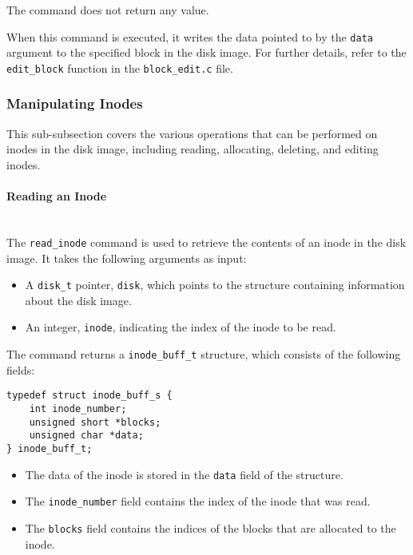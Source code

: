 \documentclass{article}
\begin{document}
The command does not return any value.

When this command is executed, it writes the data pointed to by the \texttt{data} argument to the specified block in the disk image. For further details, refer to the \texttt{edit\_block} function in the \texttt{block\_edit.c} file.

\subsubsection{Manipulating Inodes}

This sub-subsection covers the various operations that can be performed on inodes in the disk image, including reading, allocating, deleting, and editing inodes.

\paragraph{Reading an Inode}\mbox{}\\
The \texttt{read\_inode} command is used to retrieve the contents of an inode in the disk image. It takes the following arguments as input:

\begin{itemize}
    \item A \texttt{disk\_t} pointer, \texttt{disk}, which points to the structure containing information about the disk image.
    \item An integer, \texttt{inode}, indicating the index of the inode to be read.
\end{itemize}

The command returns a \texttt{inode\_buff\_t} structure, which consists of the following fields:

\begin{lstlisting}[style=cstyle]
typedef struct inode_buff_s {
    int inode_number;
    unsigned short *blocks;
    unsigned char *data;
} inode_buff_t;
\end{lstlisting}

\begin{itemize}
    \item The data of the inode is stored in the \texttt{data} field of the structure.
    \item The \texttt{inode\_number} field contains the index of the inode that was read.
    \item The \texttt{blocks} field contains the indices of the blocks that are allocated to the inode.
\end{itemize}
\end{document}
